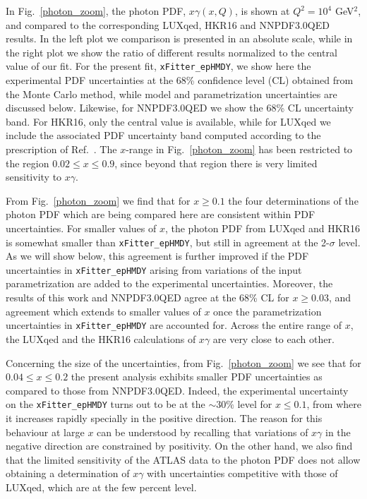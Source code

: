 In Fig.~\ref{photon_zoom}, the photon PDF, $x\gamma(x,Q)$, is shown at
$Q^2=10^4$ GeV$^2$,  and compared to the corresponding LUXqed,
HKR16 and NNPDF3.0QED results.
%
In the left plot we comparison is presented in an absolute scale, while
in the right plot we show the ratio of
different results normalized to
the central value of our fit.
%
For the present fit, {\tt xFitter\_epHMDY}, we show here
the experimental PDF uncertainties at the 68\% confidence level (CL) obtained from the Monte Carlo method,
 while model and parametrization uncertainties are discussed below.
Likewise, for NNPDF3.0QED we show the 68\% CL uncertainty band.
For HKR16, only the central value is available, while for LUXqed we include
the associated PDF uncertainty band computed according to the
prescription of Ref.~\cite{Manohar:2016nzj}.
%
The $x$-range in Fig.~\ref{photon_zoom} has been restricted to the region
$0.02 \le x \le 0.9$, since beyond that region there is very limited sensitivity to $x\gamma$.

From Fig.~\ref{photon_zoom} we find that for $x\ge 0.1$ the four determinations of
the photon PDF which are being compared here are consistent within PDF uncertainties.
%
For smaller values of $x$, the photon PDF from LUXqed and HKR16 is somewhat smaller than {\tt xFitter\_epHMDY},
but still in agreement at the 2-$\sigma$ level.
%
As we will show below, this agreement is further improved if the PDF uncertainties in
{\tt xFitter\_epHMDY}
arising from variations of the input parametrization are added to the experimental
uncertainties.
%
Moreover, the results of this work and NNPDF3.0QED agree at the 68\% CL for $x\ge 0.03$,
and agreement which extends to smaller values of $x$ once the parametrization
uncertainties in {\tt xFitter\_epHMDY} are accounted for.
%
Across the entire range of $x$, the LUXqed and the HKR16 calculations of $x\gamma$ are very close
to each other.

Concerning the size of the uncertainties, from Fig.~\ref{photon_zoom} we see that
for $0.04 \le x \le 0.2$ the present analysis  exhibits smaller PDF
uncertainties as compared to those from  NNPDF3.0QED.
%
Indeed, the experimental uncertainty on the {\tt xFitter\_epHMDY}
turns out to be at the  $\sim 30\%$ level for $x\le 0.1$, from where it increases
rapidly specially in the positive direction.
%
The reason for this behaviour at large $x$ can be understood by recalling that
variations of $x\gamma$ in the negative
direction are constrained by positivity.
%
On the other hand, we also find that the limited sensitivity of the ATLAS data to the photon
PDF does not allow obtaining a determination of $x\gamma$ with uncertainties
competitive with those of LUXqed, which are at the few percent level.

